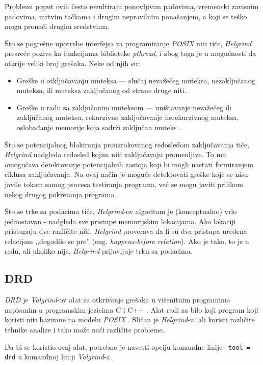 \documentclass[12pt,oneside]{memoir}
\theoremstyle{plain}
\theoremstyle{definition}
\begin{document}
Problemi poput ovih često rezultiraju ponovljivim padovima, vremenski zavisnim padovima, mrtvim tačkama i drugim nepravilnim ponašanjem, a koji se teško mogu pronaći drugim sredstvima.

Što se pogrešne upotrebe interfejsa za programiranje \textit{POSIX} niti tiče, \textit{Helgrind} presreće pozive ka funkcijama biblioteke \textit{pthread}, i zbog toga je u mogućnosti da otkrije veliki broj grešaka. Neke od njih su: 
\begin{itemize}
\item Greške u otključavanju muteksa --– slučaj nevažećeg muteksa, nezaključanog muteksa, ili muteksa zaključanog od strane druge niti.
\item Greške u radu sa zaključanim muteksom --– uništavanje nevažećeg ili zaključanog muteksa, rekurzivno zaključavanje nerekurzivnog muteksa, oslobađanje memorije koja sadrži zaključan muteks \cite{Helgrind}.
\end{itemize}

Što se potencijalnog blokiranja prouzrokovanog redosledom zaključavanja tiče, \textit{Helgrind} nadgleda redosled kojim niti zaključavaju promenljive. To mu omogućava detektovanje potencijalnih zastoja koji bi mogli nastati formiranjem ciklusa zaključavanja. Na ovaj način je moguće detektovati greške koje se nisu javile tokom samog procesa testiranja programa, već se mogu javiti prilikom nekog drugog pokretanja programa \cite{Helgrind}.

Što se trke sa podacima tiče, \textit{Helgrind}-ov algoritam je (konceptualno) vrlo jednostavan - nadgleda sve pristupe memorijskim lokacijama. Ako lokaciji pristupaju dve različite niti, \textit{Helgrind} proverava da li su dva pristupa uređena relacijom ,,dogodilo se pre'' (eng. \textit{happens-before relation}). Ako je tako, to je u redu, ali ukoliko nije, \textit{Helgrind} prijavljuje trku sa podacima.

\subsection{DRD}
\textit{DRD} je \textit{Valgrind}-ov alat za otkrivanje grešaka u višenitnim programima napisanim u programskim jezicima C i C++ \cite{Drd}. Alat radi za bilo koji program koji koristi niti bazirane na modelu \textit{POSIX} \cite{Drd}. Sličan je \textit{Helgrind}-u, ali koristi različite tehnike analize i tako može naći različite probleme.

Da bi se koristio ovaj alat, potrebno je navesti opciju komandne linije \texttt{--tool = drd} u komandnoj liniji \textit{Valgrind}-a.
\end{document}
